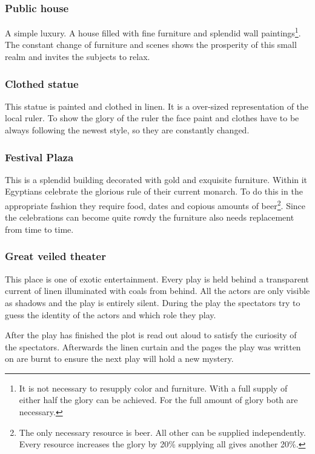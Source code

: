 \documentclass[a4paper]{book}
\begin{document}
		\subsubsection{Public house}
			A simple luxury. A house filled with fine furniture and splendid wall paintings\footnote{
				It is not necessary to resupply color and furniture.
				With a full supply of either half the glory can be achieved.
				For the full amount of glory both are necessary.
			}.
			The constant change of furniture and scenes shows the prosperity of this small realm
			and invites the subjects to relax.

		\subsubsection{Clothed statue}
			This statue is painted and clothed in linen.
			It is a over-sized representation of the local ruler.
			To show the glory of the ruler the face paint and clothes
			have to be always following the newest style,
			so they are constantly changed.

		\subsubsection{Festival Plaza}
			This is a splendid building decorated with gold and exquisite furniture.
			Within it \gls{Egyptians} celebrate the glorious rule of their current monarch.
			To do this in the appropriate fashion they require food, dates and copious amounts of beer\footnote{
				The only necessary resource is beer. All other can be supplied independently.
				Every resource increases the glory by 20\% supplying all gives another 20\%.
			}.
			Since the celebrations can become quite rowdy the furniture also needs replacement from time
			to time.

		\subsubsection{Great veiled theater}
			This place is one of exotic entertainment.
			Every play is held behind a transparent current of linen illuminated with coals from behind.
			All the actors are only visible as shadows and the play is entirely silent.
			During the play the spectators try to guess the identity of the actors
			and which role they play.

			After the play has finished the plot is read out aloud to satisfy the curiosity
			of the spectators.
			Afterwards the linen curtain and the pages the play was written on are burnt
			to ensure the next play will hold a new mystery.
\end{document}
